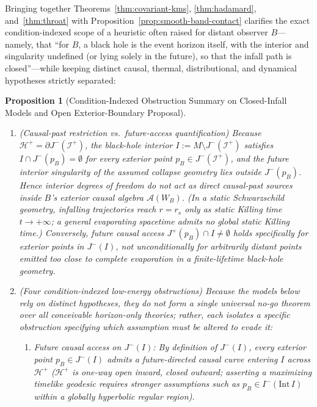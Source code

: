 \documentclass[11pt,a4paper]{article}
\newtheorem{proposition}{Proposition}
\theoremstyle{definition}
\theoremstyle{remark}
\newcommand{\cA}{\mathcal{A}}
\newcommand{\1}{\mathbf{1}}
\begin{document}
Bringing together Theorems~\ref{thm:covariant-kms}, \ref{thm:hadamard}, and~\ref{thm:throat} with Proposition~\ref{prop:smooth-band-contact} clarifies the exact condition-indexed scope of a heuristic often raised for distant observer $B$---namely, that ``for $B$, a black hole is the event horizon itself, with the interior and singularity undefined (or lying solely in the future), so that the infall path is closed''---while keeping distinct causal, thermal, distributional, and dynamical hypotheses strictly separated:

\begin{proposition}[Condition-Indexed Obstruction Summary on Closed-Infall Models and Open Exterior-Boundary Proposal]\label{prop:closed-infall-nogo}
\leavevmode
\begin{enumerate}
  \item[(I)] \emph{(Causal-past restriction vs.\ future-access quantification)} Because $\mathcal{H}^+ = \partial J^-(\mathcal{I}^+)$, the black-hole interior $I := M\setminus J^-(\mathcal{I}^+)$ satisfies $I\cap J^-(p_B)=\emptyset$ for every exterior point $p_B\in J^-(\mathcal{I}^+)$, and the future interior singularity of the assumed collapse geometry lies outside $J^-(p_B)$. Hence interior degrees of freedom do not act as direct causal-past sources inside $B$'s exterior causal algebra $\cA(W_B)$. (In a \emph{static} Schwarzschild geometry, infalling trajectories reach $r=r_s$ only as static Killing time $t\to+\infty$; a general evaporating spacetime admits no global static Killing time.) Conversely, future causal access $J^+(p_B)\cap I\neq\emptyset$ holds specifically for exterior points in $J^-(I)$, not unconditionally for arbitrarily distant points emitted too close to complete evaporation in a finite-lifetime black-hole geometry.
  \item[(II)] \emph{(Four condition-indexed low-energy obstructions)} Because the models below rely on distinct hypotheses, they do not form a single universal no-go theorem over all conceivable horizon-only theories; rather, each isolates a specific obstruction specifying which assumption must be altered to evade it:
  \begin{enumerate}
    \item \emph{Future causal access on $J^-(I)$:} By definition of $J^-(I)$, every exterior point $p_B\in J^-(I)$ admits a future-directed causal curve entering $I$ across $\mathcal{H}^+$ ($\mathcal{H}^+$ is one-way open inward, closed outward; asserting a maximizing timelike geodesic requires stronger assumptions such as $p_B\in I^-(\mathrm{Int}\,I)$ within a globally hyperbolic regular region).

\end{enumerate}
\end{enumerate}
\end{proposition}
\end{document}
